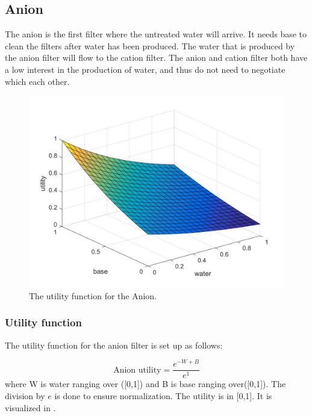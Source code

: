 
\subsection{Anion}
The anion is the first filter where the untreated water will arrive. It needs base to clean the filters after water has been produced. The water that is produced by the anion filter will flow to the cation filter. The anion and cation filter both have a low interest in the production of water, and thus do not need to negotiate which each other.%

\begin{figure}[h]
	\centering
	\includegraphics[width=0.7\linewidth]{img/Anion_utility}
	\caption{The utility function for the Anion.}
	\label{fig:anionutility}
\end{figure}

\subsubsection{Utility function}
The utility function for the anion filter is set up as follows:

\[
\text{Anion utility} = \frac{e^{-W+B}}{e^1}
\]
where W is water ranging over ([0,1]) and B is base ranging over([0,1]). The division by $e$ is done to ensure normalization. The utility is in [0,1]. It is visualized in .

